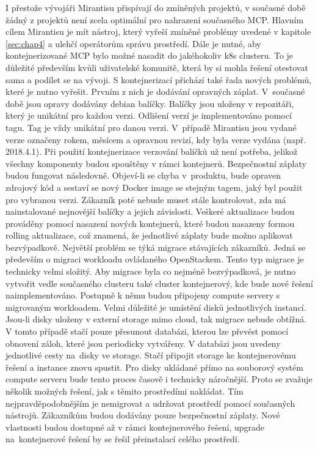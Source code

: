I přestože vývojáři Mirantisu přispívají do zmíněných projektů, v současné době žádný z projektů není zcela optimální pro nahrazení současného MCP. Hlavním cílem Mirantisu je mít nástroj, který vyřeší zmíněné problémy uvedené v kapitole \ref{sec:chap4} a ulehčí operátorům správu prostředí. Dále je nutné, aby kontejnerizované MCP bylo možné nasadit do jakéhokoliv k8s clusteru. To je důležité především kvůli uživatelské komunitě, která by si mohla řešení otestovat sama a podílet se na vývoji. S kontejnerizací přichází také řada nových problémů, které je nutno vyřešit. Prvním z nich je dodávání opravných záplat. V současné době jsou opravy dodávány debian balíčky. Balíčky jsou uloženy v repozitáři, který je unikátní pro každou verzi. Odlišení verzí je implementováno pomocí tagu. Tag je vždy unikátní pro danou verzi. V případě Mirantisu jsou vydané verze označeny rokem, měsícem a opravnou revizí, kdy byla verze vydána (např. 2018.4.1). Při použití kontejnerizace verzování balíčků už není potřeba, jelikož všechny komponenty budou spouštěny v rámci kontejnerů. Bezpečnostní záplaty budou fungovat následovně. Objeví-li se chyba v produktu, bude opraven zdrojový kód a sestaví se nový Docker image se stejným tagem, jaký byl použit pro vybranou verzi. Zákazník poté nebude muset stále kontrolovat, zda má nainstalované nejnovější balíčky a jejich závislosti. Veškeré aktualizace budou prováděny pomocí nasazení nových kontejnerů, které budou nasazeny formou rolling aktualizace, což znamená, že jednotlivé záplaty bude možno aplikovat bezvýpadkově. Největší problém se týká migrace stávajících zákazníků. Jedná se především o migraci workloadu ovládaného OpenStackem. Tento typ migrace je technicky velmi složitý. Aby migrace byla co nejméně bezvýpadková, je nutno vytvořit vedle současného clusteru také cluster kontejnerový, kde bude nové řešení naimplementováno. Postupně k němu budou připojeny compute servery s migrovaným workloadem. Velmi důležité je umístění disků jednotlivých instancí. Jsou-li disky uloženy v externí storage mimo cloud, tak migrace nebude obtížná. V tomto případě stačí pouze přesunout databázi, kterou lze převést pomocí obnovení záloh, které jsou periodicky vytvářeny. V databázi jsou uvedeny jednotlivé cesty na disky ve storage. Stačí připojit storage ke kontejnerovému řešení a instance znovu spustit. Pro disky ukládané přímo na souborový systém compute serveru bude tento proces časově i technicky náročnější. Proto se zvažuje několik možných řešení, jak s těmito prostředími nakládat. Tím nejpravděpodobnějším je nemigrovat a udržovat prostředí pomocí současných nástrojů. Zákazníkům budou dodávány pouze bezpečnostní záplaty. Nové vlastnosti budou dostupné až v rámci kontejnerového řešení, upgrade na kontejnerové řešení by se řešil přeinstalací celého prostředí.

